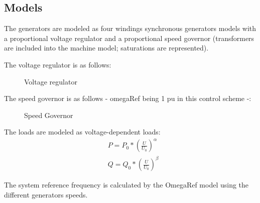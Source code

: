 \documentclass[a4paper, 12pt]{report}
\begin{document}
\subsection{Models}

The generators are modeled as four windings synchronous generators models with a proportional voltage regulator and a proportional speed governor (transformers are included into the machine model; saturations are represented).

The voltage regulator is as follows:
\begin{figure}[H]
\centering
{}
\caption{Voltage regulator}
\end{figure}

The speed governor is as follows - omegaRef being 1 pu in this control scheme -:
\begin{figure}[H]
\centering
{}
\caption{Speed Governor}
\end{figure}

The loads are modeled as voltage-dependent loads:
\begin{equation*}
\begin{aligned}
& P = P_{0} * (\frac{U}{U_{0}})^\alpha \\
& Q = Q_{0} * (\frac{U}{U_{0}})^\beta
\end{aligned}
\label{Voltage-dependent load model}
\end{equation*}

The system reference frequency is calculated by the OmegaRef model using the different generators speeds.\\
\end{document}
